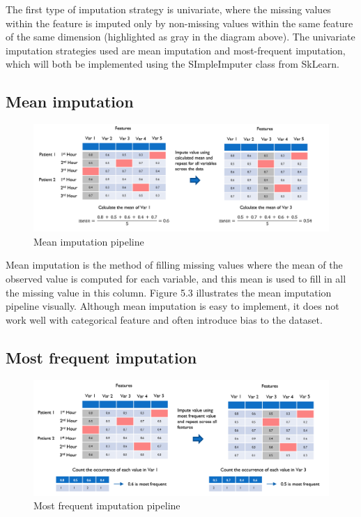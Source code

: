 \documentclass{l4proj}
\begin{document}
The first type of imputation strategy is univariate, where the missing values within the feature is imputed only by non-missing values within the same feature of the same dimension (highlighted as gray in the diagram above). The univariate imputation strategies used are mean imputation and most-frequent imputation, which will both be implemented using the SImpleImputer class from SkLearn.


\subsection{Mean imputation}

\begin{figure}[h!]
  \caption{Mean imputation pipeline}
  \includegraphics[width=\textwidth]{dissertation/Latex/images/Imputation Figures/mean imputation.PNG}
\end{figure}


Mean imputation is the method of filling missing values where the mean of the observed value is computed for each variable, and this mean is used to fill in all the missing value in this column. Figure 5.3 illustrates the mean imputation pipeline visually. Although mean imputation is easy to implement, it does not work well with categorical feature and often introduce bias to the dataset.



\subsection{Most frequent imputation}

\begin{figure}[h!]
  \caption{Most frequent imputation pipeline}
  \includegraphics[width=\textwidth]{dissertation/Latex/images/Imputation Figures/most frequent.PNG}
\end{figure}
\end{document}
